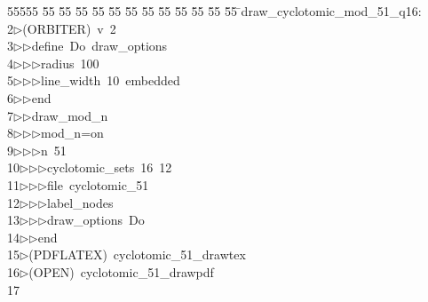 %
%
\begin{tabbing}
55555 \= 55 \= 55 \= 55 \= 55 \= 55 \= 55 \= 55 \= 55 \= 55 \= 55 \= 55 \= 55 \= \>draw\_cyclotomic\_mod\_51\_q16:\\[0pt]
2\>$\triangleright$\>(ORBITER)\ v\ 2\ \\[0pt]
3\>$\triangleright$\>$\triangleright$\>define\ Do\ draw\_options\ \\[0pt]
4\>$\triangleright$\>$\triangleright$\>$\triangleright$\>radius\ 100\ \\[0pt]
5\>$\triangleright$\>$\triangleright$\>$\triangleright$\>line\_width\ 10\ embedded\ \\[0pt]
6\>$\triangleright$\>$\triangleright$\>end\ \\[0pt]
7\>$\triangleright$\>$\triangleright$\>draw\_mod\_n\ \\[0pt]
8\>$\triangleright$\>$\triangleright$\>$\triangleright$\>mod\_n=on\ \\[0pt]
9\>$\triangleright$\>$\triangleright$\>$\triangleright$\>n\ 51\ \\[0pt]
10\>$\triangleright$\>$\triangleright$\>$\triangleright$\>cyclotomic\_sets\ 16\ 12\ \\[0pt]
11\>$\triangleright$\>$\triangleright$\>$\triangleright$\>file\ cyclotomic\_51\ \\[0pt]
12\>$\triangleright$\>$\triangleright$\>$\triangleright$\>label\_nodes\ \\[0pt]
13\>$\triangleright$\>$\triangleright$\>$\triangleright$\>draw\_options\ Do\ \\[0pt]
14\>$\triangleright$\>$\triangleright$\>end\\[0pt]
15\>$\triangleright$\>(PDFLATEX)\ cyclotomic\_51\_drawtex\\[0pt]
16\>$\triangleright$\>(OPEN)\ cyclotomic\_51\_drawpdf\\[0pt]
17\>\end{tabbing}
